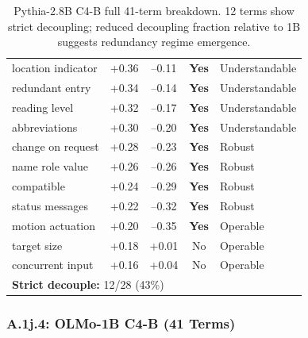 \documentclass[10pt]{article} %
\begin{document}
\begin{table}[H]
\begin{tabular}{|l|c|c|c|l|}
location indicator & +0.36 & --0.11 & \textbf{Yes} & Understandable \\
redundant entry & +0.34 & --0.14 & \textbf{Yes} & Understandable \\
reading level & +0.32 & --0.17 & \textbf{Yes} & Understandable \\
abbreviations & +0.30 & --0.20 & \textbf{Yes} & Understandable \\
change on request & +0.28 & --0.23 & \textbf{Yes} & Robust \\
name role value & +0.26 & --0.26 & \textbf{Yes} & Robust \\
compatible & +0.24 & --0.29 & \textbf{Yes} & Robust \\
status messages & +0.22 & --0.32 & \textbf{Yes} & Robust \\
motion actuation & +0.20 & --0.35 & \textbf{Yes} & Operable \\
target size & +0.18 & +0.01 & No & Operable \\
concurrent input & +0.16 & +0.04 & No & Operable \\
\hline
\multicolumn{4}{|l|}{\textbf{Strict decouple:} 12/28 (43\%)} \\
\hline
\end{tabular}
\caption{Pythia-2.8B C4-B full 41-term breakdown. 12 terms show strict decoupling; reduced decoupling fraction relative to 1B suggests redundancy regime emergence.}
\end{table}

\subsubsection*{A.1j.4: OLMo-1B C4-B (41 Terms)}
\end{document}
